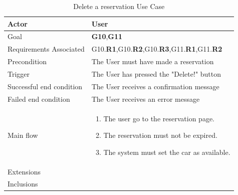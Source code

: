 \newline
\begin{table}[htb]
\begin{center}
\renewcommand{\arraystretch}{1.5}
\begin{tabular}{|l|p{}|}
\hline
Actor & User \\ \hline
Goal & \textbf{G10},\textbf{G11} \\ \hline
Requirements Associated & G10.\textbf{R1},G10.\textbf{R2},G10.\textbf{R3},G11.\textbf{R1},G11.\textbf{R2} \\ \hline
Precondition & The User must have made a reservation \\ \hline
Trigger & The User has pressed the "Delete!" button \\ \hline
Successful end condition & The User receives a confirmation message \\ \hline
Failed end condition & The User receives an error message \\ \hline
Main flow & \begin{minipage}[t]{0.6\textwidth}
\begin{enumerate}
\addtolength{\itemindent}{0.5cm}
\item The user go to the reservation page.
\item The reservation must not be expired.
\item The system must set the car as available. 
\vspace{1,5mm}
\end{enumerate}
\end{minipage} \\ \hline
Extensions & \\ \hline
Inclusions & \\ \hline
\end{tabular}
\caption{Delete a reservation Use Case}
\end{center}
\end{table}
\clearpage

